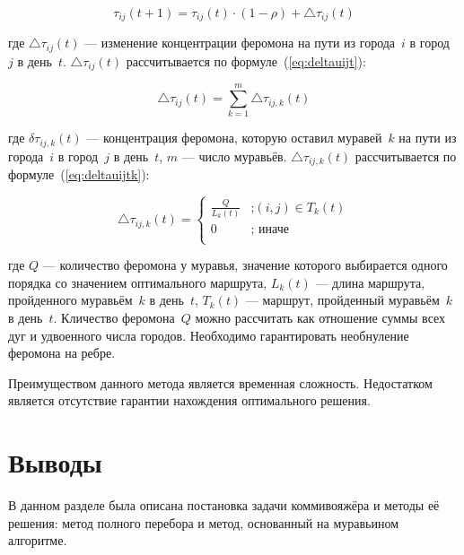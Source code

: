 \begin{equation}
	\label{eq:tauijt}
	\tau_{ij}(t+1) = \tau_{ij}(t)\cdot(1-\rho)+\triangle\tau_{ij}(t)
\end{equation}

\noindent где $\triangle\tau_{ij}(t)$ --- изменение концентрации феромона на пути из города~$i$ в город~$j$ в день~$t$. $\triangle\tau_{ij}(t)$ рассчитывается по формуле~(\ref{eq:deltauijt}):

\begin{equation}
	\label{eq:deltauijt}
	\triangle\tau_{ij}(t) = \sum_{k=1}^{m}\triangle\tau_{ij,k}(t)
\end{equation}

\noindent где $\delta\tau_{ij,k}(t)$ --- концентрация феромона, которую оставил муравей~$k$ на пути из города~$i$ в город~$j$ в день~$t$, $m$ --- число муравьёв. $\triangle\tau_{ij,k}(t)$ рассчитывается по формуле~(\ref{eq:deltauijtk}):

\begin{equation}
	\label{eq:deltauijtk}
	\triangle\tau_{ij,k}(t) = \begin{cases}
		\frac{Q}{L_k(t)} &\text{;} (i, j) \in T_k(t)\\
		0 &\text{; иначе}\\
	\end{cases}
\end{equation}

\noindent где $Q$ --- количество феромона у муравья, значение которого выбирается одного порядка со значением оптимального маршрута, $L_k(t)$ --- длина маршрута, пройденного муравьём~$k$ в день~$t$, $T_k(t)$ --- маршрут, пройденный муравьём~$k$ в день~$t$. Кличество феромона~$Q$ можно рассчитать как отношение суммы всех дуг и удвоенного числа городов. Необходимо гарантировать необнуление феромона на ребре.

Преимуществом данного метода является временная сложность. Недостатком является отсутствие гарантии нахождения оптимального решения.

\section*{Выводы}

В данном разделе была описана постановка задачи коммивояжёра и методы её решения: метод полного перебора и метод, основанный на муравьином алгоритме.